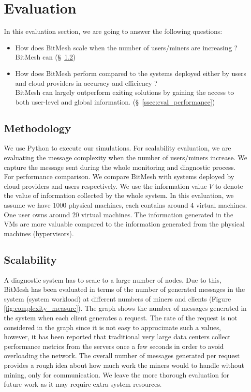 \documentclass[11px]{article}
\newcommand{\projTitle}{BitMesh\xspace}
\begin{document}
\section{Evaluation}
In this evaluation section, we are going to answer the following questions:

\begin{itemize}
  \item How does \projTitle scale when the number of users/miners are increasing ? \\
      \projTitle can (\S~\ref{ssec:eval_scalability})
  \item How does \projTitle perform compared to the systems deployed either by users and cloud providers in accuracy and efficiency ? \\
      \projTitle can largely outperform exiting solutions by gaining the access to both user-level and global information. (\S~\ref{ssec:eval_performance})
\end{itemize}

\subsection{Methodology}
We use Python to execute our simulations. For scalability evaluation, we are evaluating the message complexity when the number of users/miners increase. We capture the message sent during the whole monitoring and diagnostic process. For performance comparison. We compare \projTitle with systems deployed by cloud providers and users respectively. We use the information value $V$ to denote the value of information collected by the whole system. In this evaluation, we assume we have 1000 physical machines, each contains around 4 virtual machines. One user owns around 20 virtual machines. The information generated in the VMs are more valuable compared to the information generated from the physical machines (hypervisors).

\subsection{Scalability}
\label{ssec:eval_scalability}
A diagnostic system has to scale to a large number of nodes. Due to this, \projTitle has been evaluated in terms of the number of generated messages in the system (system workload) at different numbers of miners and clients (Figure \ref{fig:complexity_measure}). The graph shows the number of messages generated in the system when each client generates a request. The rate of the request is not considered in the graph since it is not easy to approcimate such a values, however, it has been reported that traditional very large data centers collect performance metrics from the servers once a few seconds \cite{microsoft-autopilot} in order to avoid overloading the network. The overall number of messages generated per request provides a rough idea about how much work the miners would to handle without mining, only for communication. We leave the more thorough evaluation for future work as it may require extra system resources.
\end{document}
